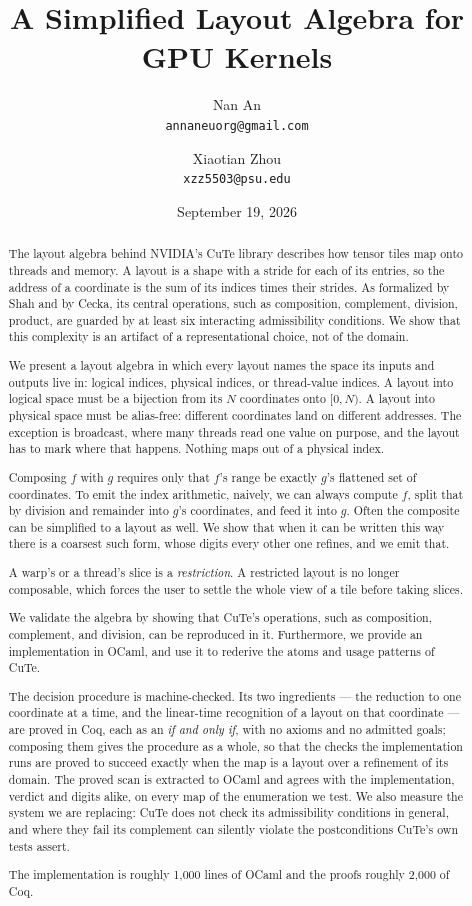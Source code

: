 \documentclass[11pt]{article}
\title{A Simplified Layout Algebra for GPU Kernels}
\author{Nan An\\ \texttt{annaneuorg@gmail.com}
  \and Xiaotian Zhou\\ \texttt{xzz5503@psu.edu}}
\date{September 19, 2026}
\theoremstyle{definition}
\begin{document}
\maketitle

\begin{abstract}
The layout algebra behind NVIDIA's CuTe library describes how tensor
tiles map onto threads and memory. A layout is a shape with a stride for each
of its entries, so the address of a coordinate is the sum of its indices times
their strides. As formalized by Shah and by Cecka, its
central operations, such as composition, complement, division, product, are
guarded by at least six interacting admissibility conditions. We show that this
complexity is an artifact of a representational choice, not of the domain.

We present a layout algebra in which every layout names the space its inputs
and outputs live in: logical indices, physical indices, or thread-value
indices. A layout into logical space must be a bijection from its $N$
coordinates onto $[0,N)$. A layout into physical space must be alias-free:
different coordinates land on different addresses. The exception is broadcast,
where many threads read one value on purpose, and the layout has to mark where
that happens. Nothing maps out of a physical index.

Composing $f$ with $g$ requires only that $f$'s range be exactly $g$'s
flattened set of coordinates. To emit the index arithmetic, naively, we can
always compute $f$, split that by division and remainder into $g$'s
coordinates, and feed it into $g$. Often the composite can be simplified to a
layout as well. We show that when it can be written this way there is a
coarsest such form, whose digits every other one refines, and we emit that.

A warp's or a thread's slice is a \emph{restriction}. A restricted layout is no
longer composable, which forces the user to settle the whole view of a tile
before taking slices.

We validate the algebra by showing that CuTe's operations, such as composition,
complement, and division, can be reproduced in it. Furthermore, we provide an
implementation in OCaml, and use it to rederive the atoms and usage patterns of
CuTe.

The decision procedure is machine-checked. Its two ingredients --- the
reduction to one coordinate at a time, and the linear-time recognition of a
layout on that coordinate --- are proved in Coq, each as an \emph{if and only
if}, with no axioms and no admitted goals; composing them gives the procedure
as a whole, so that the checks the implementation runs are proved to succeed
exactly when the map is a layout over a refinement of its domain. The proved
scan is extracted to OCaml and agrees with the implementation, verdict and
digits alike, on every map of the enumeration we test. We also measure the
system we are replacing: CuTe does not check its admissibility conditions in
general, and where they fail its complement can silently violate the
postconditions CuTe's own tests assert.

The implementation is roughly 1{,}000 lines of OCaml and the proofs roughly
2{,}000 of Coq.
\end{abstract}
\end{document}
